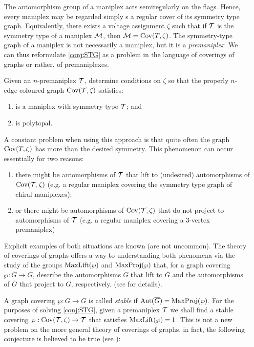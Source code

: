\documentclass[a4paper,12pt,english]{article}
\begin{document}
The automorphism group of a maniplex acts semiregularly on the flags.
Hence, every maniplex may be regarded simply s a regular cover of its symmetry type graph. 
Equivalently, there exists a voltage assignment $\zeta$ such that if $\mathcal{T}$ is the symmetry type of a maniplex $\mathcal{M}$, then $\mathcal{M} = \operatorname{Cov}(T,\zeta)$.
The symmetry-type graph of a maniplex is not necessarily a maniplex, but it is a \emph{premaniplex}.
We can thus reformulate \cref{conj:STG} as a problem in the language of coverings of graphs or rather, of premaniplexes.

\begin{problem}\label{prob:STGgraphs}
  Given an $n$-premaniplex $\mathcal{T}$, determine conditions on $\zeta$ so that the properly $n$-edge-coloured graph $\operatorname{Cov}(\mathcal{T},\zeta)$ satisfies:
  \begin{enumerate}[label=\textit{\alph*)}]
      \item is a maniplex with symmetry type $\mathcal{T}$; and
      \item is polytopal.
  \end{enumerate}
  \end{problem}

A constant problem when using this approach is that quite often the graph $\operatorname{Cov}(T, \zeta)$ has more than the desired symmetry. 
This phenomenon can occur essentially for two reasons:
\begin{enumerate}[label=\textit{\roman*)}]
  \item there might be automorphisms of $\mathcal{T}$ that lift to (undesired) automorphisms of $\operatorname{Cov}(\mathcal{T},\zeta)$ (e.g. a regular maniplex covering the symmetry type graph of chiral maniplexes);
  \item or there might be automorphisms of $\operatorname{Cov}(\mathcal{T},\zeta)$ that do not project to automorphisms of $\mathcal{T}$ (e.g. a regular maniplex covering a $3$-vertex premaniplex) 
\end{enumerate}

Explicit examples of both situations are known  (are not uncommon). 
The theory of coverings of graphs offers a way to understanding both phenomena via the study of the groups $\operatorname{MaxLift}(\wp)$ and $\operatorname{MaxProj}(\wp)$ that, for a graph covering $\wp: \bar{G} \to G$, describe the automorphisms $G$ that lift to $\bar{G}$ and the automorphisms of $\bar{G}$ that project to $G$, respectively. (see \cite{MalniPozar2016_SplitStructureLifted,MalniPozar2019_SplitLiftingsSectional,MalnMarPot2004_ElementaryAbelianCovers,MalnNedSko2000_LiftingGraphAutomorphisms} for details).

A graph covering $\wp: \bar{G} \to G$ is called \emph{stable} if $\operatorname{Aut}(\overline{G}) = \operatorname{MaxProj}(\wp)$. 
For the purposes of solving \cref{conj:STG}, given a premaniplex $\mathcal{T}$ we shall find a stable covering $\wp: \operatorname{Cov}(\mathcal{T}, \zeta) \to \mathcal{T}$ that satisfies $\operatorname{MaxLift}(\wp) = 1$. 
This is not a new problem on the more general theory of coverings of graphs, in fact, the following conjecture is believed to be true (see \cite{PotocSpiga2019_LiftingPrescribedGroup}):
\end{document}
